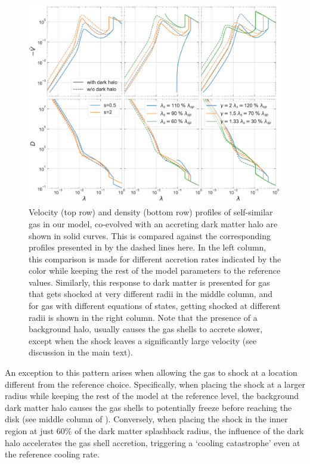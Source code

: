 \begin{figure}[htbp]
\centering
\includegraphics[width=\linewidth,trim={0 0.5cm 0cm 0},clip]{plots/profiles_gas_w-wo_halo_all.pdf}
\caption{Velocity (top row) and density (bottom row) profiles of self-similar gas in our model, co-evolved with an accreting dark matter halo are shown in solid curves. This is compared against the corresponding profiles presented in  by the dashed lines here. In the left column, this comparison is made for different accretion rates indicated by the color while keeping the rest of the model parameters to the reference values. Similarly, this response to dark matter is presented for gas that gets shocked at very different radii in the middle column, and for gas with different equations of states, getting shocked at different radii is shown in the right column. Note that the presence of a background halo, usually causes the gas shells to accrete slower, except when the shock leaves a significantly large velocity (see discussion in the main text).}
\label{fig:halo-influence-on-gas-ch:ssr}
\end{figure}

An exception to this pattern arises when allowing the gas to shock at a location different from the reference choice. Specifically, when placing the shock at a larger radius while keeping the rest of the model at the reference level, the background dark matter halo causes the gas shells to potentially freeze before reaching the disk (see middle column of ). Conversely, when placing the shock in the inner region at just $60\%$ of the dark matter splashback radius, the influence of the dark halo accelerates the gas shell accretion, triggering a `cooling catastrophe' even at the reference cooling rate.

